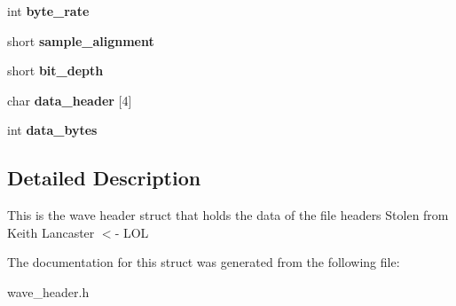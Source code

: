 \begin{DoxyCompactItemize}
int {\bfseries byte\+\_\+rate}
\item 
\mbox{\label{structwaveHeader_ac9e502a29bb14000e18240fefee183f4}} 
short {\bfseries sample\+\_\+alignment}
\item 
\mbox{\label{structwaveHeader_a230e972ed14faf71b79093ad9566e37a}} 
short {\bfseries bit\+\_\+depth}
\item 
\mbox{\label{structwaveHeader_a2fa6e3abc3c939f095abd37b5c4387f4}} 
char {\bfseries data\+\_\+header} \mbox{[}4\mbox{]}
\item 
\mbox{\label{structwaveHeader_a74e0f403a7d6a88bbc552c18a318dde7}} 
int {\bfseries data\+\_\+bytes}
\end{DoxyCompactItemize}


\subsection{Detailed Description}
This is the wave header struct that holds the data of the file headers Stolen from Keith Lancaster $<$-\/ L\+OL 

The documentation for this struct was generated from the following file\+:\begin{DoxyCompactItemize}
\item 
wave\+\_\+header.\+h\end{DoxyCompactItemize}
